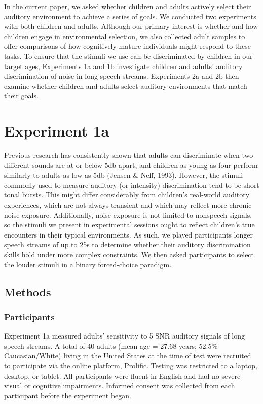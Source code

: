 \documentclass[10pt, letterpaper]{article}
\begin{document}
In the current paper, we asked whether children and adults actively
select their auditory environment to achieve a series of goals. We
conducted two experiments with both children and adults. Although our
primary interest is whether and how children engage in environmental
selection, we also collected adult samples to offer comparisons of how
cognitively mature individuals might respond to these tasks. To ensure
that the stimuli we use can be discriminated by children in our target
ages, Experiments 1a and 1b investigate children and adults' auditory
discrimination of noise in long speech streams. Experiments 2a and 2b
then examine whether children and adults select auditory environments
that match their goals.

\hypertarget{experiment-1a}{%
\section{Experiment 1a}\label{experiment-1a}}

Previous research has consistently shown that adults can discriminate
when two different sounds are at or below 5db apart, and children as
young as four perform similarly to adults as low as 5db (Jensen \& Neff,
1993). However, the stimuli commonly used to measure auditory (or
intensity) discrimination tend to be short tonal bursts. This might
differ considerably from children's real-world auditory experiences,
which are not always transient and which may reflect more chronic noise
exposure. Additionally, noise exposure is not limited to nonspeech
signals, so the stimuli we present in experimental sessions ought to
reflect children's true encounters in their typical environments. As
such, we played participants longer speech streams of up to 25s to
determine whether their auditory discrimination skills hold under more
complex constraints. We then asked participants to select the louder
stimuli in a binary forced-choice paradigm.

\hypertarget{methods}{%
\subsection{Methods}\label{methods}}

\hypertarget{participants}{%
\subsubsection{Participants}\label{participants}}

Experiment 1a measured adults' sensitivity to 5 SNR auditory signals of
long speech streams. A total of 40 adults (mean age = 27.68 years;
52.5\% Caucasian/White) living in the United States at the time of test
were recruited to participate via the online platform, Prolific. Testing
was restricted to a laptop, desktop, or tablet. All participants were
fluent in English and had no severe visual or cognitive impairments.
Informed consent was collected from each participant before the
experiment began.
\end{document}
